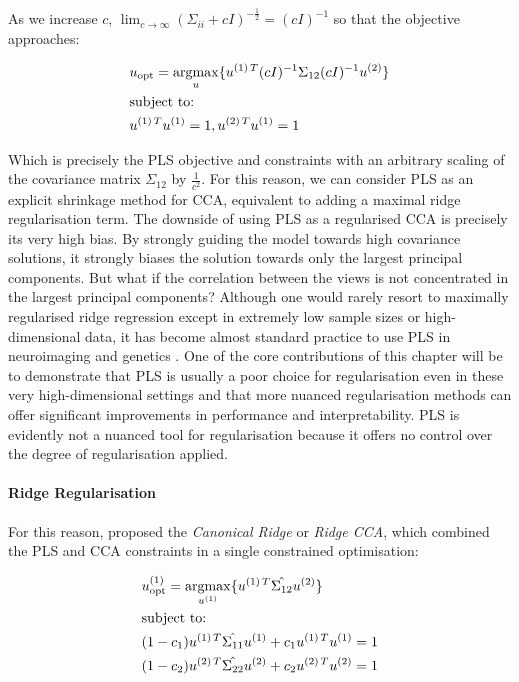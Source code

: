 As we increase $c$, $\lim_{c \to \infty} (\Sigma_{ii}+ c I)^{-\frac{1}{2}}= (c I)^{-1}$ so that the objective approaches:

\begin{align}
    & u_{\text{opt}}=\underset{u}{\mathrm{argmax}}\{ u^{(1)\,T}(c I)^{-1}\Sigma_{12}(c I)^{-1}u^{(2)} \} \\
    & \text{subject to:} \notag \\
    & u^{(1)\,T}u^{(1)}=1, u^{(2)\,T}u^{(1)}=1 \notag
\end{align}

Which is precisely the PLS objective and constraints with an arbitrary scaling of the covariance matrix $\Sigma_{12}$ by $\frac{1}{c^2}$.
For this reason, we can consider PLS as an explicit shrinkage method for CCA, equivalent to adding a maximal ridge regularisation term.
The downside of using PLS as a regularised CCA is precisely its very high bias.
By strongly guiding the model towards high covariance solutions, it strongly biases the solution towards only the largest principal components.
But what if the correlation between the views is not concentrated in the largest principal components?
Although one would rarely resort to maximally regularised ridge regression except in extremely low sample sizes or high-dimensional data, it has become almost standard practice to use PLS in neuroimaging and genetics \citep{cruciani2022pls, krishnan2011partial}.
One of the core contributions of this chapter will be to demonstrate that PLS is usually a poor choice for regularisation even in these very high-dimensional settings and that more nuanced regularisation methods can offer significant improvements in performance and interpretability.
PLS is evidently not a nuanced tool for regularisation because it offers no control over the degree of regularisation applied.

\paragraph{Ridge Regularisation} For this reason, \citet{vinod1976canonical} proposed the \textit{Canonical Ridge} or \textit{Ridge CCA}, which combined the PLS and CCA constraints in a single constrained optimisation:

\begin{align}
    & u^{(1)}_{\text{opt}} = \underset{u^{(1)}}{\mathrm{argmax}} \{ u^{(1)\,T} \hat{\Sigma_{12}} u^{(2)} \} \\
    & \text{subject to:} \notag \\
    & (1 - c_1) u^{(1)\,T} \hat{\Sigma_{11}} u^{(1)} + c_1 u^{(1)\,T} u^{(1)} = 1 \notag \\
    & (1 - c_2) u^{(2)\,T} \hat{\Sigma_{22}} u^{(2)} + c_2 u^{(2)\,T} u^{(2)} = 1 \notag
\end{align}

